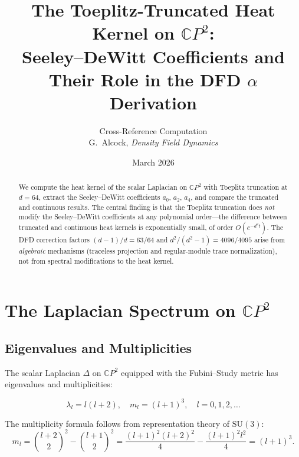 \documentclass[12pt,a4paper]{article}
\title{The Toeplitz-Truncated Heat Kernel on $\mathbb{C}P^2$:\\[6pt]
\large Seeley--DeWitt Coefficients and Their Role in the DFD $\alpha$ Derivation}
\author{Cross-Reference Computation\\
G.\ Alcock, \textit{Density Field Dynamics}}
\date{March 2026}
\begin{document}
\maketitle

\begin{abstract}
We compute the heat kernel of the scalar Laplacian on $\mathbb{C}P^2$
with Toeplitz truncation at $d = 64$, extract the Seeley--DeWitt
coefficients $a_0$, $a_2$, $a_4$, and compare the truncated and
continuous results.  The central finding is that the Toeplitz
truncation does \emph{not} modify the Seeley--DeWitt coefficients at
any polynomial order---the difference between truncated and continuous
heat kernels is exponentially small, of order $O(e^{-d^2 t})$.
The DFD correction factors $(d-1)/d = 63/64$ and $d^2/(d^2-1) = 4096/4095$
arise from \emph{algebraic} mechanisms (traceless projection and regular-module
trace normalization), not from spectral modifications to the heat kernel.
\end{abstract}

\tableofcontents
\newpage

\section{The Laplacian Spectrum on $\mathbb{C}P^2$}
\label{sec:spectrum}

\subsection{Eigenvalues and Multiplicities}

The scalar Laplacian $\Delta$ on $\mathbb{C}P^2$ equipped with the Fubini--Study
metric has eigenvalues and multiplicities:

\begin{tcolorbox}[title=Spectrum of $\Delta$ on $\mathbb{C}P^2$]
\begin{equation}
\lambda_l = l(l+2), \quad
m_l = (l+1)^3, \quad
l = 0, 1, 2, \ldots
\label{eq:CP2-spectrum}
\end{equation}
\end{tcolorbox}

\noindent
The multiplicity formula follows from representation theory of $\mathrm{SU}(3)$:
\begin{equation}
m_l = \binom{l+2}{2}^{\!2} - \binom{l+1}{2}^{\!2}
    = \frac{(l+1)^2(l+2)^2}{4} - \frac{(l+1)^2 l^2}{4}
    = (l+1)^3.
\end{equation}
\end{document}
